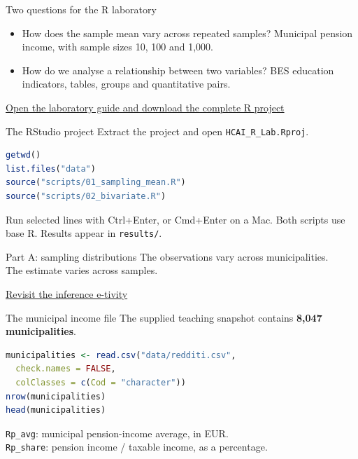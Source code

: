 \begin{frame}{Two questions for the R laboratory}
\begin{itemize}
\item How does the sample mean vary across repeated samples? Municipal pension income, with sample sizes 10, 100 and 1,000.
\item How do we analyse a relationship between two variables? BES education indicators, tables, groups and quantitative pairs.
\end{itemize}
\par\vspace{4mm}\href{https://silviasaliniunimi.github.io/data-analysis-tax-compliance/05-r-laboratory.html}{Open the laboratory guide and download the complete R project}
\end{frame}

\begin{frame}[fragile]{The RStudio project}
Extract the project and open \texttt{HCAI\_R\_Lab.Rproj}.\begin{lstlisting}[language=R]
getwd()
list.files("data")
source("scripts/01_sampling_mean.R")
source("scripts/02_bivariate.R")
\end{lstlisting}
Run selected lines with Ctrl+Enter, or Cmd+Enter on a Mac. Both scripts use base R. Results appear in \texttt{results/}.
\end{frame}

\begin{frame}{Part A: sampling distributions}
\Large The observations vary across municipalities.\\[4mm]The estimate varies across samples.\par\vspace{6mm}\normalsize\href{https://silviasaliniunimi.github.io/data-analysis-tax-compliance/03-inference.html}{Revisit the inference e-tivity}
\end{frame}

\begin{frame}[fragile]{The municipal income file}
The supplied teaching snapshot contains \textbf{8,047 municipalities}.\begin{lstlisting}[language=R]
municipalities <- read.csv("data/redditi.csv",
  check.names = FALSE,
  colClasses = c(Cod = "character"))
nrow(municipalities)
head(municipalities)
\end{lstlisting}
\texttt{Rp\_avg}: municipal pension-income average, in EUR.\\\texttt{Rp\_share}: pension income / taxable income, as a percentage.
\end{frame}


